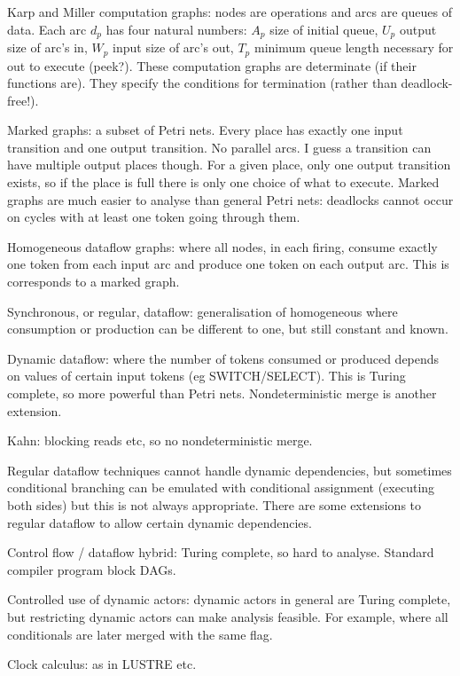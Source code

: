 Karp and Miller computation graphs: nodes are operations and arcs are queues of data.
Each arc $d_p$ has four natural numbers: $A_p$ size of initial queue, $U_p$ output size of arc's in, $W_p$ input size of arc's out, $T_p$ minimum queue length necessary for out to execute (peek?).
These computation graphs are determinate (if their functions are). They specify the conditions for termination (rather than deadlock-free!).

Marked graphs: a subset of Petri nets. Every place has exactly one input transition and one output transition. No parallel arcs. I guess a transition can have multiple output places though.
For a given place, only one output transition exists, so if the place is full there is only one choice of what to execute.
Marked graphs are much easier to analyse than general Petri nets: deadlocks cannot occur on cycles with at least one token going through them.

Homogeneous dataflow graphs: where all nodes, in each firing, consume exactly one token from each input arc and produce one token on each output arc. This is corresponds to a marked graph.

Synchronous, or regular, dataflow: generalisation of homogeneous where consumption or production can be different to one, but still constant and known.

Dynamic dataflow: where the number of tokens consumed or produced depends on values of certain input tokens (eg SWITCH/SELECT). This is Turing complete, so more powerful than Petri nets.
Nondeterministic merge is another extension.

Kahn: blocking reads etc, so no nondeterministic merge.

Regular dataflow techniques cannot handle dynamic dependencies, but sometimes conditional branching can be emulated with conditional assignment (executing both sides) but this is not always appropriate.
There are some extensions to regular dataflow to allow certain dynamic dependencies.

Control flow / dataflow hybrid: Turing complete, so hard to analyse.
Standard compiler program block DAGs.

Controlled use of dynamic actors: dynamic actors in general are Turing complete, but restricting dynamic actors can make analysis feasible. For example, where all conditionals are later merged with the same flag.

Clock calculus: as in LUSTRE etc.

